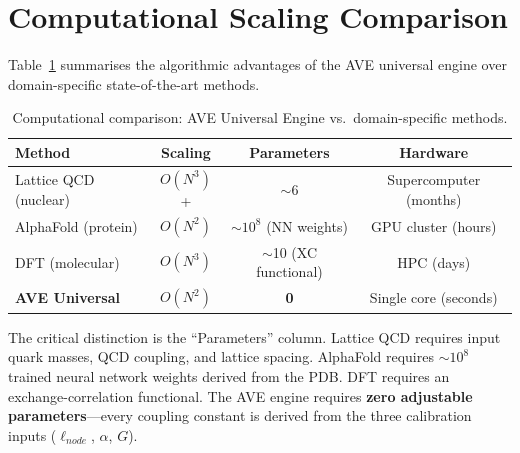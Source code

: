 \section{Computational Scaling Comparison}

Table~\ref{tab:overdrive_comparison} summarises the algorithmic advantages of the AVE universal engine over domain-specific state-of-the-art methods.

\begin{table}[H]
\centering
\caption{Computational comparison: AVE Universal Engine vs.\ domain-specific methods.}
\label{tab:overdrive_comparison}
\small
\begin{tabular}{@{}l c c c@{}}
\toprule
\textbf{Method} & \textbf{Scaling} & \textbf{Parameters} & \textbf{Hardware} \\
\midrule
Lattice QCD (nuclear)      & $O(N^3)$+ & $\sim$6  & Supercomputer (months) \\
AlphaFold (protein)        & $O(N^2)$  & $\sim 10^8$ (NN weights)  & GPU cluster (hours) \\
DFT (molecular)            & $O(N^3)$  & $\sim$10 (XC functional) & HPC (days) \\
\midrule
\textbf{AVE Universal}     & $O(N^2)$  & \textbf{0}  & Single core (seconds) \\
\bottomrule
\end{tabular}
\end{table}

\noindent The critical distinction is the ``Parameters'' column. Lattice QCD requires input quark masses, QCD coupling, and lattice spacing. AlphaFold requires $\sim 10^8$ trained neural network weights derived from the PDB. DFT requires an exchange-correlation functional. The AVE engine requires \textbf{zero adjustable parameters}---every coupling constant is derived from the three calibration inputs ($\ell_{node}$, $\alpha$, $G$).

